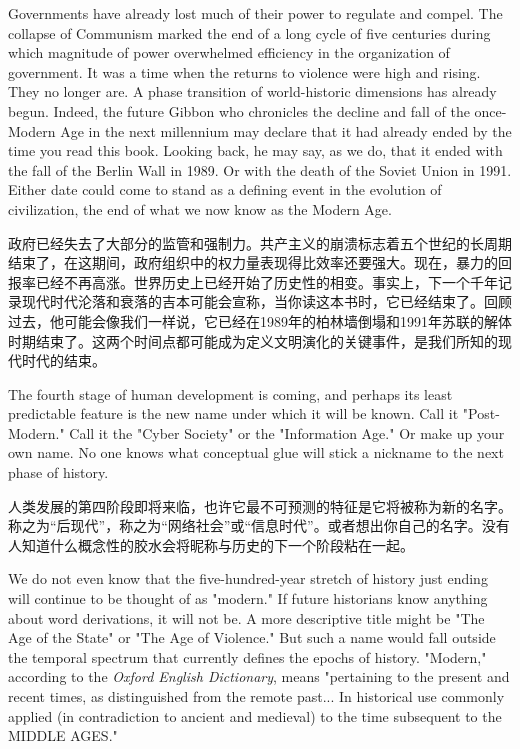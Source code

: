 \begin{paracol}{2}
\switchcolumn*
Governments have already lost much of their power to regulate and compel. The collapse of Communism marked the end of a long cycle of five centuries during which magnitude of power overwhelmed efficiency in the organization of government. It was a time when the returns to violence were high and rising. They no longer are. A phase transition of world-historic dimensions has already begun. Indeed, the future Gibbon who chronicles the decline and fall of the once-Modern Age in the next millennium may declare that it had already ended by the time you read this book. Looking back, he may say, as we do, that it ended with the fall of the Berlin Wall in 1989. Or with the death of the Soviet Union in 1991. Either date could come to stand as a defining event in the evolution of civilization, the end of what we now know as the Modern Age.

\switchcolumn
政府已经失去了大部分的监管和强制力。共产主义的崩溃标志着五个世纪的长周期结束了，在这期间，政府组织中的权力量表现得比效率还要强大。现在，暴力的回报率已经不再高涨。世界历史上已经开始了历史性的相变。事实上，下一个千年记录现代时代沦落和衰落的吉本可能会宣称，当你读这本书时，它已经结束了。回顾过去，他可能会像我们一样说，它已经在1989年的柏林墙倒塌和1991年苏联的解体时期结束了。这两个时间点都可能成为定义文明演化的关键事件，是我们所知的现代时代的结束。

\switchcolumn*
The fourth stage of human development is coming, and perhaps its least predictable feature is the new name under which it will be known. Call it "Post-Modern." Call it the "Cyber Society" or the "Information Age." Or make up your own name. No one knows what conceptual glue will stick a nickname to the next phase of history.

\switchcolumn
人类发展的第四阶段即将来临，也许它最不可预测的特征是它将被称为新的名字。称之为“后现代”，称之为“网络社会”或“信息时代”。或者想出你自己的名字。没有人知道什么概念性的胶水会将昵称与历史的下一个阶段粘在一起。

\switchcolumn*
We do not even know that the five-hundred-year stretch of history just ending will continue to be thought of as "modern." If future historians know anything about word derivations, it will not be. A more descriptive title might be "The Age of the State" or "The Age of Violence." But such a name would fall outside the temporal spectrum that currently defines the epochs of history. "Modern," according to the \emph{Oxford English Dictionary}, means "pertaining to the present and recent times, as distinguished from the remote past... In historical use commonly applied (in contradiction to ancient and medieval) to the time subsequent to the MIDDLE AGES."


\end{paracol}
